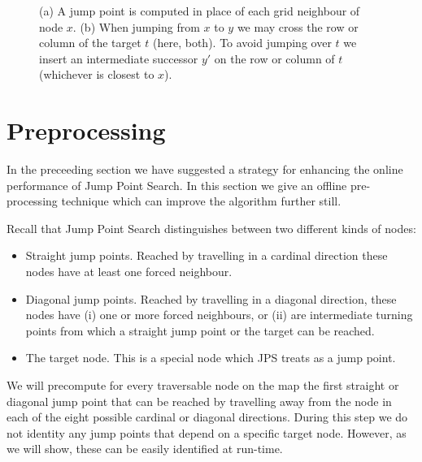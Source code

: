 \begin{figure*}[tb]
       \label{fig:preproc}
       \begin{center}
         \scalebox{.8}{}
       \end{center}
       \caption{(a) A jump point is computed in place of each grid neighbour of node $x$.
		(b) When jumping from $x$ to $y$ we may cross the row or column of the target $t$ (here, both). 
To avoid jumping over $t$ we insert an intermediate successor $y'$ on the row or column of $t$ (whichever is closest to $x$).}
\end{figure*}

\section{Preprocessing}
\label{sec::preprocessing}

In the preceeding section we have suggested a strategy for enhancing the
online performance of Jump Point Search.  In this section we give an offline
pre-processing technique which can improve the algorithm further still.

Recall that Jump Point Search distinguishes between two different kinds of
nodes:
\begin{itemize}
\item Straight jump points. Reached by travelling in a
cardinal direction these nodes have at least one forced neighbour.
\item Diagonal jump points. Reached by travelling in a diagonal direction, 
these nodes have (i) one or more forced neighbours, or (ii) are 
intermediate turning points from which a straight jump point or the 
target can be reached.
\item The target node. This is a special node which JPS treats as a jump point.
\end{itemize}

We will precompute for every traversable node on the map the first
straight or diagonal jump point that can be reached by travelling 
away from the node in each of the eight possible cardinal or diagonal 
directions. During this step we do not identity any jump points that 
depend on a specific target node.  However, as we will show, these 
can be easily identified at run-time. 


